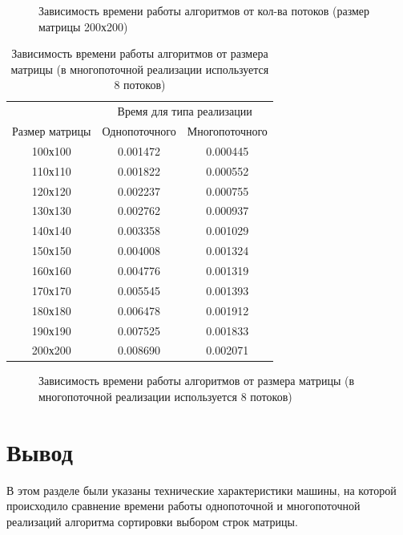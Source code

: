 \documentclass[a4paper,14pt, unknownkeysallowed]{extreport}
\newcommand{\img}[3] {
	\begin{figure}[h!]
		\center{\texttt{[image: img/\#2]}}
		\caption{#3}
		\label{img:#2}
	\end{figure}
}
\begin{document}
\img{108mm}{graph_different_threads}{Зависимость времени работы алгоритмов от кол-ва потоков (размер матрицы 200х200)}

\clearpage

\begin{table}[h]
	\begin{center}
	\begin{threeparttable}
		\captionsetup{justification=raggedright,singlelinecheck=off}
		\caption{\label{tbl:graph_different_sizes} Зависимость времени работы алгоритмов от размера матрицы (в многопоточной реализации используется 8 потоков)}
		\begin{tabular}{|c|c|c|}
			\hline 
			& \multicolumn{2}{c|}{Время для типа реализации} \\ \cline{2-3}
			Размер матрицы & Однопоточного & Многопоточного \\
			\hline
			100х100 & 0.001472 & 0.000445 \\
			\hline
			110х110 & 0.001822 & 0.000552 \\
			\hline
			120х120 & 0.002237 & 0.000755 \\
			\hline
			130х130 & 0.002762 & 0.000937 \\
			\hline
			140х140 & 0.003358 & 0.001029 \\
			\hline
			150х150 & 0.004008 & 0.001324 \\
			\hline
			160х160 & 0.004776 & 0.001319 \\
			\hline
			170х170 & 0.005545 & 0.001393 \\
			\hline
			180х180 & 0.006478 & 0.001912 \\
			\hline
			190х190 & 0.007525 & 0.001833 \\
			\hline
			200х200 & 0.008690 & 0.002071 \\
			\hline
		\end{tabular}
	\end{threeparttable}
	\end{center}
\end{table}

\img{110mm}{graph_different_sizes}{Зависимость времени работы алгоритмов от размера матрицы (в многопоточной реализации используется 8 потоков)}

\clearpage

\section{Вывод}

В этом разделе были указаны технические характеристики машины, на которой происходило сравнение времени работы однопоточной и многопоточной реализаций алгоритма сортировки выбором строк матрицы.
\end{document}
